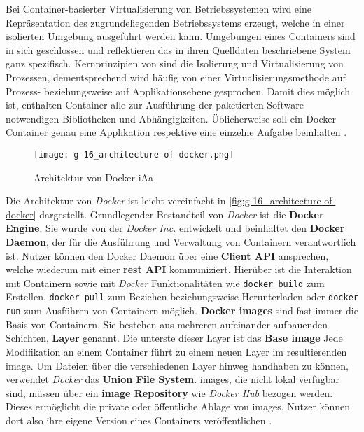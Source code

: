 Bei Container-basierter Virtualisierung von Betriebssystemen wird eine Repräsentation des zugrundeliegenden Betriebssystems erzeugt, welche in einer isolierten Umgebung ausgeführt werden kann. Umgebungen eines Containers sind in sich geschlossen und reflektieren das in ihren Quelldaten beschriebene System ganz spezifisch. Kernprinzipien von  sind die Isolierung und Virtualisierung von Prozessen, dementsprechend wird häufig von einer Virtualisierungsmethode auf Prozess- beziehungsweise auf Applikationsebene gesprochen. Damit dies möglich ist, enthalten Container alle zur Ausführung der paketierten Software notwendigen Bibliotheken und Abhängigkeiten. Üblicherweise soll ein Docker Container genau eine Applikation respektive eine einzelne Aufgabe beinhalten \cite{014:Managing-Container-based-Software-Development-Environments}.

\begin{figure}[h]
    \centering
    \texttt{[image: g-16\_architecture-of-docker.png]}
    \caption{Architektur von Docker \acrshort{iAa} \citeauthor{021:Docker-Security-Threat-Model-and-Best-Practices}}
    \label{fig:g-16_architecture-of-docker}
\end{figure}

Die Architektur von \textit{Docker} ist leicht vereinfacht in \autoref{fig:g-16_architecture-of-docker} dargestellt. Grundlegender Bestandteil von \textit{Docker} ist die \textbf{Docker Engine}. Sie wurde von der \textit{Docker Inc.} entwickelt und beinhaltet den \textbf{Docker Daemon}, der für die Ausführung und Verwaltung von Containern verantwortlich ist. Nutzer können den Docker Daemon über eine \textbf{Client API} ansprechen, welche wiederum mit einer \textbf{\Gls{rest} API} kommuniziert. Hierüber ist die Interaktion mit Containern sowie mit \textit{Docker} Funktionalitäten wie \texttt{docker build} zum Erstellen, \texttt{docker pull} zum Beziehen beziehungsweise Herunterladen oder \texttt{docker run} zum Ausführen von Containern möglich. \textbf{Docker \Glspl{image}} sind fast immer die Basis von Containern. Sie bestehen aus mehreren aufeinander aufbauenden Schichten, \textbf{Layer} genannt. Die unterste dieser Layer ist das \textbf{Base \Gls{image}} Jede Modifikation an einem Container führt zu einem neuen Layer im resultierenden \Gls{image}. Um Dateien über die verschiedenen Layer hinweg handhaben zu können, verwendet \textit{Docker} das \textbf{Union File System}. \Glspl{image}, die nicht lokal verfügbar sind, müssen über ein \textbf{\Gls{image} Repository} wie \textit{Docker Hub} bezogen werden. Dieses ermöglicht die private oder öffentliche Ablage von \Glspl{image}, Nutzer können dort also ihre eigene Version eines Containers veröffentlichen \cite{021:Docker-Security-Threat-Model-and-Best-Practices}.

